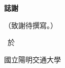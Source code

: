 \thispagestyle{empty}

\begin{center}
\Large
\textbf{誌\hspace{1cm}謝}
\end{center}

\vspace{1cm}
\linespread{2}%
\selectfont
\hspace{0.25cm}

（致謝待撰寫。）

\vspace{3cm}
\begin{flushright}
\studentCnName \ 於

國立陽明交通大學\ \NameofDepartmentInstituteCN

\ThesisDateTW
\end{flushright}